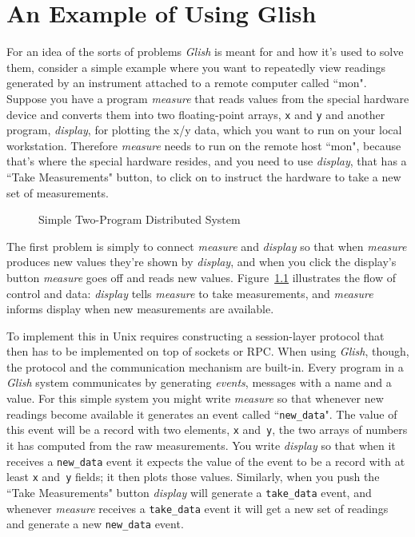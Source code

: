 
\chapter{An Example of Using Glish}

For an idea of the sorts of problems {\em Glish} is meant for and how it's used
to solve them, consider a simple
example
where you want to repeatedly view
readings generated by an instrument attached to a remote computer called
``mon".  Suppose you have a program {\em measure} that reads values from the
special hardware device and converts them into two floating-point arrays,
{\tt x} and {\tt y} and another program, {\em display},
for plotting the x/y data, which you  want to run on your
local workstation.  Therefore {\em measure} needs to run on the remote host ``mon",
because that's where the special hardware resides, and you  need 
to use  {\em display}, that has a ``Take Measurements"
button, to click on to instruct the hardware to take a new set of
measurements.

\begin{figure}[h]
\centerline{}
\caption{ Simple Two-Program Distributed System }
\label{ex1}
\end{figure}

The first problem is simply to connect 
{\em measure} and {\em display} so that when {\em measure} produces
new values they're shown by {\em display\/}, and when you click
the display's button {\em measure} goes off and reads new values.
Figure~\ref{ex1}
illustrates the flow of control and data: {\em display} tells {\em measure}
to take measurements, and {\em measure} informs display when new measurements
are available.

To implement this in {\sc Unix} requires constructing
a session-layer protocol
that then has to be implemented on top of
sockets or RPC.  When using {\em Glish},
though, the protocol and the communication mechanism are
built-in.
Every program in a {\em Glish} system communicates by generating {\em events\/},
messages with a name and a value.
For this simple system you might
write {\em measure} so that whenever new readings become available it
generates an event called ``{\tt new\_data}".  The value of
this event will be a record with two elements, {\tt x} and~{\tt y}, the two
arrays of numbers it has computed from the raw measurements.  You 
write {\em display} so that when it receives a {\tt new\_data}
event it expects the value of the event to be a record with at least
{\tt x} and~{\tt y} fields; it then plots those values.  Similarly,
when you push the ``Take Measurements" button {\em display} will
generate a {\tt take\_data} event, and whenever {\em measure}
receives a {\tt take\_data} event it will get a new set of
readings and generate a new {\tt new\_data} event.

